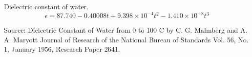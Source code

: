 \documentclass{article}
\begin{document}
Dielectric constant of water.
\begin{equation}
\epsilon
=
87.740 - 0.40008t + 9.398\times 10^{-4} t^2 - 1.410 \times 10^{-8} t^3
\end{equation}

Source:
Dielectric Constant of Water from 0 to 100 C
by C. G. Malmberg and A. A. Maryott
Journal of Research of the National Bureau of Standards
Vol. 56, No. 1, January 1956, Research Paper 2641.
\end{document}
